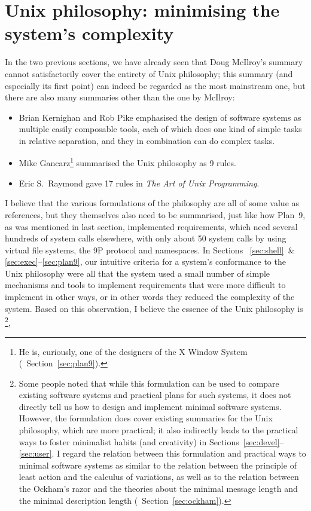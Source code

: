 \section{Unix philosophy: minimising the system's complexity}\label{sec:complex}

In the two previous sections, we have already seen that Doug McIlroy's
summary cannot satisfactorily cover the entirety of Unix philosophy;
this summary (and especially its first point) can indeed be regarded as
the most mainstream one, but there are also many summaries other than
the one by McIlroy:
\begin{itemize}
\item Brian Kernighan and Rob Pike emphasised the design of software systems as
	multiple easily composable tools, each of which does one kind of simple
	tasks in relative separation, and they in combination can do complex tasks.
\item Mike Gancarz\footnote{He is, curiously, one of the designers of the
	X Window System (\cf~Section~\ref{sec:plan9}).} summarised
	the Unix philosophy as 9 rules.
\item Eric S.\ Raymond gave 17 rules in \emph{The Art of Unix Programming}.
\end{itemize}
I believe that the various formulations of the philosophy are all of some value
as references, but they themselves also need to be summarised, just like how
Plan~9, as was mentioned in last section, implemented requirements, which need
several hundreds of system calls elsewhere, with only about 50 system calls
by using virtual file systems, the 9P protocol and namespaces.  In Sections~%
\ref{sec:shell}~\& \ref{sec:exec}--\ref{sec:plan9}, our intuitive criteria
for a system's conformance to the Unix philosophy were all that the system
used a small number of simple mechanisms and tools to implement requirements
that were more difficult to implement in other ways, or in other words they
reduced the complexity of the system.  Based on this observation, I believe
the essence of the Unix philosophy is \footnote%
{Some people noted that while this formulation can be used to compare existing
software systems and practical plans for such systems, it does not directly
tell us how to design and implement minimal software systems.  However, the
formulation does cover existing summaries for the Unix philosophy, which
are more practical; it also indirectly leads to the practical ways to foster
minimalist habits (and creativity) in Sections~\ref{sec:devel}--\ref{sec:user}.
I regard the relation between this formulation and practical ways to minimal
software systems as similar to the relation between the principle of least
action and the calculus of variations, as well as to the relation between
the Ockham's razor and the theories about the minimal message length
and the minimal description length (\cf~Section~\ref{sec:ockham}).},

